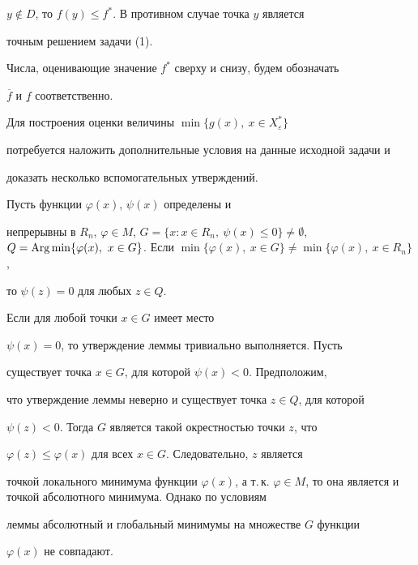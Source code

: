 $y\notin D$, то $f(y)\le f^*$. В противном случае точка $y$ является 


точным решением задачи (1).





Числа, оценивающие значение $f^*$ сверху и снизу, будем обозначать


$\overline{f}$ и $\underline{f}$ соответственно.





Для построения оценки величины $\min\{g(x),\ x\in X_{\varepsilon}^*\}$


потребуется наложить дополнительные условия на данные исходной задачи и


доказать несколько вспомогательных утверждений.





\begin{lem}


Пусть функции $\varphi(x)$, $\psi(x)$ определены и


непрерывны в $R_n$, $\varphi\in M$, $G=\{x: x\in R_n,\ \psi(x)\le


0\}\ne\emptyset$, $Q=\Arg\min\{\varphi(x),\ x\in


G\}$. Если $\min\{\varphi(x),\ x\in G\}\ne\min\{\varphi(x),\ x\in R_n\}$,


то $\psi(z)=0$ для любых $z\in Q$.


\end{lem}





\begin{pf}


Если для любой точки $x\in G$ имеет место


$\psi(x)=0$, то утверждение леммы тривиально выполняется. Пусть


существует точка $x\in G$, для которой $\psi(x)<0$. Предположим,


что утверждение леммы неверно и существует точка $z\in Q$, для которой


$\psi(z)<0$. Тогда $G$ является такой окрестностью точки $z$, что


$\varphi(z)\le\varphi(x)$ для всех $x\in G$. Следовательно, $z$ является


точкой локального минимума функции $\varphi(x)$, а т.\,к. $\varphi \in


M$, то она является и точкой абсолютного минимума. Однако по условиям


леммы абсолютный и глобальный минимумы на множестве $G$ функции


$\varphi(x)$ не совпадают.


\end{pf}





